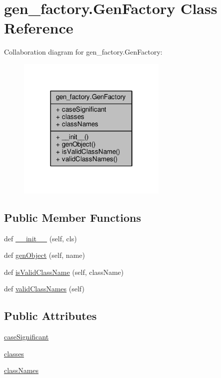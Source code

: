 \hypertarget{classgen__factory_1_1_gen_factory}{}\section{gen\+\_\+factory.\+Gen\+Factory Class Reference}
\label{classgen__factory_1_1_gen_factory}


Collaboration diagram for gen\+\_\+factory.\+Gen\+Factory\+:
\nopagebreak
\begin{figure}[H]
\begin{center}
\leavevmode
\includegraphics[width=202pt]{classgen__factory_1_1_gen_factory__coll__graph}
\end{center}
\end{figure}
\subsection*{Public Member Functions}
\begin{DoxyCompactItemize}
\item 
def \hyperlink{classgen__factory_1_1_gen_factory_a519ddaf62a8d97e9ee0624e91ac39368}{\+\_\+\+\_\+init\+\_\+\+\_\+} (self, cls)
\item 
def \hyperlink{classgen__factory_1_1_gen_factory_aeb00856af2fa15d7973be43678779561}{gen\+Object} (self, name)
\item 
def \hyperlink{classgen__factory_1_1_gen_factory_ae778039c093668c28d6ea32c92ff082c}{is\+Valid\+Class\+Name} (self, class\+Name)
\item 
def \hyperlink{classgen__factory_1_1_gen_factory_aafa5db7ad22687c37e6b6a73da52fb2f}{valid\+Class\+Names} (self)
\end{DoxyCompactItemize}
\subsection*{Public Attributes}
\begin{DoxyCompactItemize}
\item 
\hyperlink{classgen__factory_1_1_gen_factory_a7a23dc95968c745a9570a42e8e331232}{case\+Significant}
\item 
\hyperlink{classgen__factory_1_1_gen_factory_a28f3142219cbe573169e5f90508908b3}{classes}
\item 
\hyperlink{classgen__factory_1_1_gen_factory_ad263a87721215cc90b4b36e06a258a41}{class\+Names}
\end{DoxyCompactItemize}


